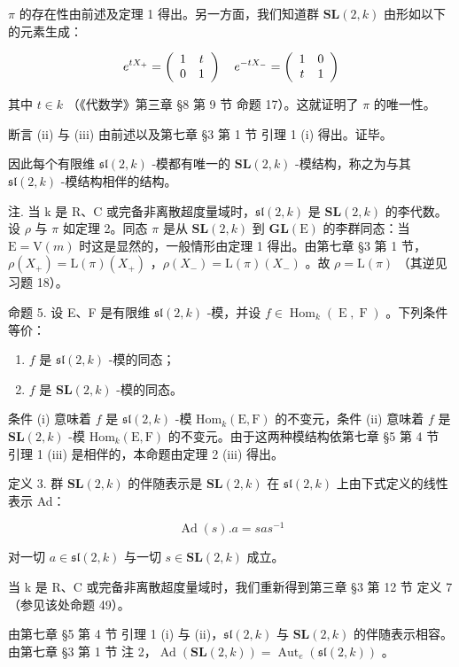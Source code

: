 \(\pi\) 的存在性由前述及定理 1 得出。另一方面，我们知道群 \(\mathbf{SL}(2,k)\) 由形如以下的元素生成：

\[
e ^ {t X _ {+}} = \left( \begin{array}{c c} 1 & t \\ 0 & 1 \end{array} \right) \quad e ^ {- t X _ {-}} = \left( \begin{array}{c c} 1 & 0 \\ t & 1 \end{array} \right)
\]

其中 \(t \in k\) （《代数学》第三章 §8 第 9 节 命题 17）。这就证明了 \(\pi\) 的唯一性。

断言 (ii) 与 (iii) 由前述以及第七章 §3 第 1 节 引理 1 (i) 得出。证毕。

因此每个有限维 \(\mathfrak{sl}(2,k)\) -模都有唯一的 \(\mathbf{SL}(2,k)\) -模结构，称之为与其 \(\mathfrak{sl}(2,k)\) -模结构相伴的结构。

注. 当 k 是 R、C 或完备非离散超度量域时，\(\mathfrak{sl}(2,k)\) 是 \(\mathbf{SL}(2,k)\) 的李代数。设 \(\rho\) 与 \(\pi\) 如定理 2。同态 \(\pi\) 是从 \(\mathbf{SL}(2,k)\) 到 \(\mathbf{GL}(\mathrm{E})\) 的李群同态：当 \(\mathrm{E} = \mathrm{V}(m)\) 时这是显然的，一般情形由定理 1 得出。由第七章 §3 第 1 节，\(\rho(X_{+}) = \mathrm{L}(\pi)(X_{+})\) ，\(\rho(X_{-}) = \mathrm{L}(\pi)(X_{-})\) 。故 \(\rho = \mathrm{L}(\pi)\) （其逆见习题 18）。

命题 5. 设 E、F 是有限维 \(\mathfrak{sl}(2,k)\) -模，并设 \(f \in \operatorname{Hom}_{k}(\operatorname{E},\operatorname{F})\) 。下列条件等价：

\begin{enumerate}
\def\labelenumi{(\roman{enumi})}
\item
  \(f\) 是 \(\mathfrak{sl}(2,k)\) -模的同态；
\item
  \(f\) 是 \(\mathbf{SL}(2,k)\) -模的同态。
\end{enumerate}

条件 (i) 意味着 \(f\) 是 \(\mathfrak{sl}(2,k)\) -模 \(\mathrm{Hom}_k(\mathrm{E},\mathrm{F})\) 的不变元，条件 (ii) 意味着 \(f\) 是 \(\mathbf{SL}(2,k)\) -模 \(\mathrm{Hom}_k(\mathrm{E},\mathrm{F})\) 的不变元。由于这两种模结构依第七章 §5 第 4 节 引理 1 (iii) 是相伴的，本命题由定理 2 (iii) 得出。

定义 3. 群 \(\mathbf{SL}(2,k)\) 的伴随表示是 \(\mathbf{SL}(2,k)\) 在 \(\mathfrak{sl}(2,k)\) 上由下式定义的线性表示 Ad：

\[
\operatorname{Ad} (s). a = s a s ^ {- 1}
\]

对一切 \(a \in \mathfrak{sl}(2, k)\) 与一切 \(s \in \mathbf{SL}(2, k)\) 成立。

当 k 是 R、C 或完备非离散超度量域时，我们重新得到第三章 §3 第 12 节 定义 7（参见该处命题 49）。

由第七章 §5 第 4 节 引理 1 (i) 与 (ii)，\(\mathfrak{sl}(2,k)\) 与 \(\mathbf{SL}(2,k)\) 的伴随表示相容。由第七章 §3 第 1 节 注 2，\(\operatorname{Ad}(\mathbf{SL}(2,k)) = \operatorname{Aut}_e(\mathfrak{sl}(2,k))\) 。

